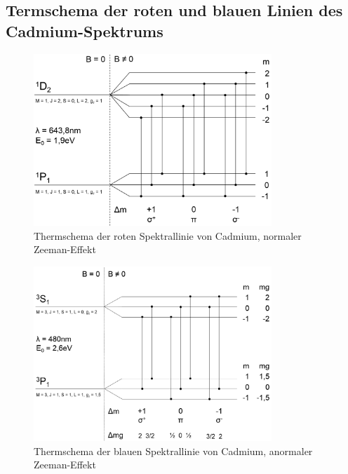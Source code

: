 \subsection{Termschema der roten und blauen Linien des Cadmium-Spektrums}
\begin{figure}
	\centering
	\includegraphics[width=0.8\textwidth]{img/rot}
	\caption{Thermschema der roten Spektrallinie von Cadmium, normaler Zeeman-Effekt}
	\label{fig:rot}
\end{figure}
\begin{figure}
	\centering
	\includegraphics[width=0.8\textwidth]{img/blau}
	\caption{Thermschema der blauen Spektrallinie von Cadmium, anormaler Zeeman-Effekt}
	\label{fig:blau}
\end{figure}
